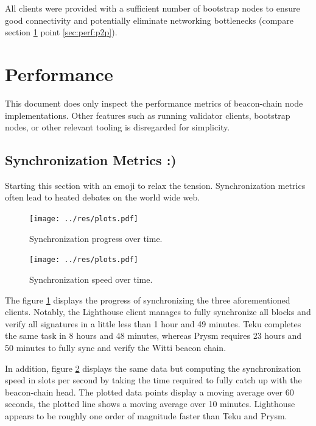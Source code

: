 \documentclass[twoside,twocolumn]{article}
\begin{document}
All clients were provided with a sufficient number of bootstrap nodes to ensure good connectivity and potentially eliminate networking bottlenecks (compare section \ref{sec:perf} point \ref{sec:perf:p2p}).\par

\section{Performance}
\label{sec:perf}
This document does only inspect the performance metrics of beacon-chain node implementations. Other features such as running validator clients, bootstrap nodes, or other relevant tooling is disregarded for simplicity.

\subsection{Synchronization Metrics :)}
Starting this section with an emoji to relax the tension. Synchronization metrics often lead to heated debates on the world wide web.\par

\begin{figure}[t]
	\centering
	\texttt{[image: ../res/plots.pdf]}
	\caption{Synchronization progress over time.}
	\label{img:sync:prog}
\end{figure}

\begin{figure}[t]
	\centering
	\texttt{[image: ../res/plots.pdf]}
	\caption{Synchronization speed over time.}
	\label{img:sync:sped}
\end{figure}

The figure \ref{img:sync:prog} displays the progress of synchronizing the three aforementioned clients. Notably, the Lighthouse client manages to fully synchronize all blocks and verify all signatures in a little less than 1 hour and 49 minutes. Teku completes the same task in 8 hours and 48 minutes, whereas Prysm requires 23 hours and 50 minutes to fully sync and verify the Witti beacon chain.\par

In addition, figure \ref{img:sync:sped} displays the same data but computing the synchronization speed in slots per second by taking the time required to fully catch up with the beacon-chain head. The plotted data points display a moving average over 60 seconds, the plotted line shows a moving average over 10 minutes. Lighthouse appears to be roughly one order of magnitude faster than Teku and Prysm.\par
\end{document}
